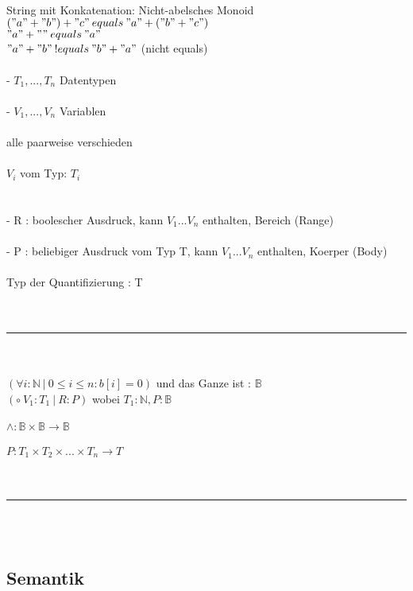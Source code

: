 \documentclass[18pt,a4paper]{article}
\begin{document}
\\
String mit Konkatenation: Nicht-abelsches Monoid\\
$("a" + "b") + "c" \:equals\: "a" + ("b" + "c")$\\
$"a" + "" \:equals\: "a"$\\
$"a" + "b" \:!equals\: "b" + "a"$ (nicht equals)\\
\\
- $T_1, ... , T_n$ Datentypen\\
\\
- $V_1, ... , V_n$ Variablen\\
\\
alle paarweise verschieden\\
\\
$V_i$ vom Typ: $T_i$\\
\\
\\
- R : boolescher Ausdruck, kann $V_1 ... V_n$ enthalten, Bereich (Range)\\
\\
- P : beliebiger Ausdruck vom Typ T, kann $V_1 ... V_n$ enthalten, Koerper (Body)\\
\\
Typ der Quantifizierung : T\\
\\
\\
\rule{\textwidth}{0.4mm}\\
\\
$(\forall i : \mathbb{N} \:\vert\: 0\leqslant i \leqslant n : b[i]=0)$ und das Ganze ist : $\mathbb{B}$\\
$(\circ\: V_1 : T_1 \:\vert\: R : P )$ wobei $T_1 : \mathbb{N}, P : \mathbb{B}$\\  
\\
$\wedge : \mathbb{B} \times \mathbb{B} \rightarrow \mathbb{B}$\\
\\
$P : T_1 \times T_2 \times ... \times T_n \rightarrow T$\\
\\
\\
\rule{\textwidth}{0.4mm}\\
\\




\subsection{Semantik}
\end{document}
